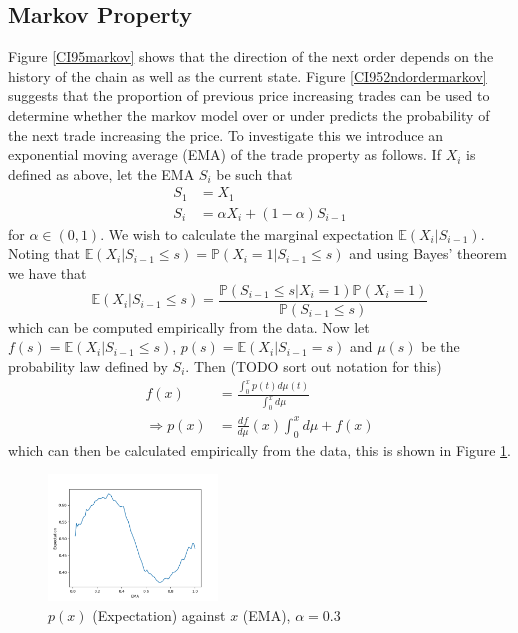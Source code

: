 \documentclass[a4paper,10pt]{article}
\begin{document}
\subsection{Markov Property}
\label{markovreplacement}
Figure \ref{CI95markov} shows that the direction of the next order depends on the history of the chain as well as the current state. Figure \ref{CI952ndordermarkov} suggests that the proportion of previous price increasing trades can be used to determine whether the markov model over or under predicts the probability of the next trade increasing the price. To investigate this we introduce an exponential moving average (EMA) of the trade property as follows. If $X_i$ is defined as above, let the EMA $S_i$ be such that
\begin{align}
S_1 &= X_1 \\
S_i &= \alpha X_i + (1 - \alpha)S_{i-1}
\end{align}
for $\alpha \in (0, 1)$. We wish to calculate the marginal expectation $\mathbb{E}(X_i | S_{i-1})$. Noting that $\mathbb{E}(X_i | S_{i-1} \leq s) = \mathbb{P}(X_i = 1 | S_{i-1} \leq s)$ and using Bayes' theorem we have that
\begin{equation}
\mathbb{E}(X_i | S_{i-1} \leq s) = \frac{\mathbb{P}(S_{i-1} \leq s | X_i = 1)\mathbb{P}(X_i = 1)}{\mathbb{P}(S_{i-1} \leq s)}
\end{equation}
which can be computed empirically from the data. Now let $f(s) = \mathbb{E}(X_i | S_{i-1} \leq s)$, $p(s) = \mathbb{E}(X_i | S_{i-1} = s)$ and $\mu(s)$ be the probability law defined by $S_i$. Then (TODO sort out notation for this)
\begin{align}
f(x) &= \frac{\int_0^x p(t)d\mu(t)}{\int_0^x d\mu} \\
\Rightarrow p(x) &= \frac{df}{d\mu}(x)\int_0^xd\mu + f(x)
\end{align}
which can then be calculated empirically from the data, this is shown in Figure \ref{probgivenema}.
\begin{figure}[h]
    \centering
    \includegraphics[width=0.4\textwidth]{images/conditional_expectation1}
    \caption{$p(x)$ (Expectation) against $x$ (EMA), $\alpha = 0.3$}
    \label{probgivenema}
\end{figure}
\end{document}
